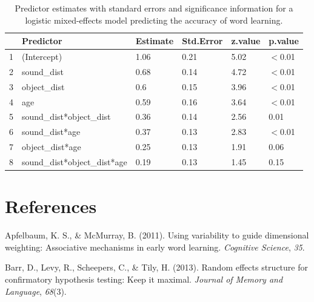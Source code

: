 \documentclass[english,,man]{apa6}
\begin{document}
\vspace{1em}

 \vspace{1em}

\begin{table}[ht]
\centering
\begin{tabular}{rlllll}
  \hline
 & Predictor & Estimate & Std.Error & z.value & p.value \\ 
  \hline
1 & (Intercept) & 1.06 & 0.21 & 5.02 & $<$0.01 \\ 
  2 & sound\_dist & 0.68 & 0.14 & 4.72 & $<$0.01 \\ 
  3 & object\_dist & 0.6 & 0.15 & 3.96 & $<$0.01 \\ 
  4 & age & 0.59 & 0.16 & 3.64 & $<$0.01 \\ 
  5 & sound\_dist*object\_dist & 0.36 & 0.14 & 2.56 & 0.01 \\ 
  6 & sound\_dist*age & 0.37 & 0.13 & 2.83 & $<$0.01 \\ 
  7 & object\_dist*age & 0.25 & 0.13 & 1.91 & 0.06 \\ 
  8 & sound\_dist*object\_dist*age & 0.19 & 0.13 & 1.45 & 0.15 \\ 
   \hline
\end{tabular}
\caption{Predictor estimates with standard errors and significance information for a logistic mixed-effects model predicting the accuracy of word learning.} 
\end{table}

\hypertarget{references}{%
\section{References}\label{references}}

\setlength{\parindent}{-0.5in}
\setlength{\leftskip}{0.5in}

\hypertarget{refs}{}
\leavevmode\hypertarget{ref-apfelbaum2011}{}%
Apfelbaum, K. S., \& McMurray, B. (2011). Using variability to guide dimensional weighting: Associative mechanisms in early word learning. \emph{Cognitive Science}, \emph{35}.

\leavevmode\hypertarget{ref-barr2013}{}%
Barr, D., Levy, R., Scheepers, C., \& Tily, H. (2013). Random effects structure for confirmatory hypothesis testing: Keep it maximal. \emph{Journal of Memory and Language}, \emph{68}(3).
\end{document}
